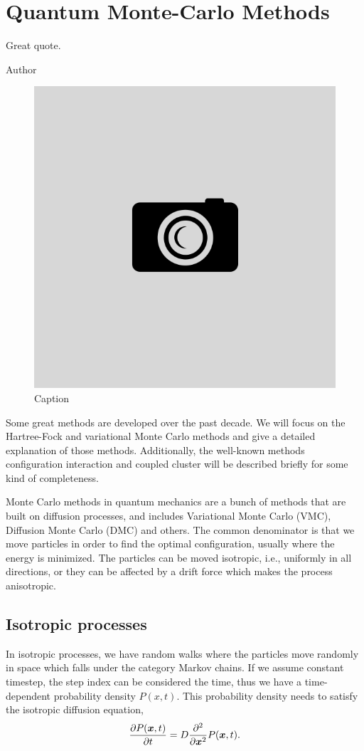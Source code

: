 \chapter{Quantum Monte-Carlo Methods} \label{chp:methods}
\epigraph{Great quote.}{Author}
\begin{figure}[H]
	\centering
	\includegraphics[scale=0.4]{Images/example.png}
	\caption{Caption}
\end{figure}

Some great methods are developed over the past decade. We will focus on the Hartree-Fock and variational Monte Carlo methods and give a detailed explanation of those methods. Additionally, the well-known methods configuration interaction and coupled cluster will be described briefly for some kind of completeness. 

Monte Carlo methods in quantum mechanics are a bunch of methods that are built on diffusion processes, and includes Variational Monte Carlo (VMC), Diffusion Monte Carlo (DMC) and others. The common denominator is that we move particles in order to find the optimal configuration, usually where the energy is minimized. The particles can be moved isotropic, i.e., uniformly in all directions, or they can be affected by a drift force which makes the process anisotropic. 

\section{Isotropic processes}
In isotropic processes, we have random walks where the particles move randomly in space which falls under the category Markov chains. If we assume constant timestep, the step index can be considered the time, thus we have a time-dependent probability density $P(x,t)$. This probability density needs to satisfy the isotropic diffusion equation,
\begin{equation}
\frac{\partial P(\boldsymbol{{x}},t)}{\partial t}=D\frac{\partial^2}{\partial \boldsymbol{{x}}^2}P(\boldsymbol{{x}},t).
\end{equation}

